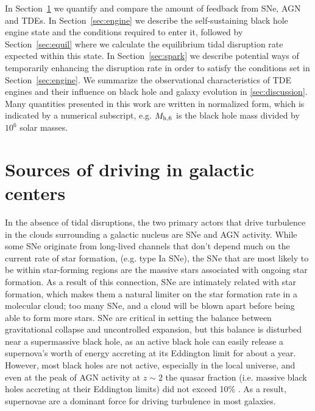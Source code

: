 \documentclass[preprint2]{aastex}
\newcommand{\mhsix}{M_{\rm h,6}\xspace}
\begin{document}
In Section~\ref{sec:sources} we quantify and compare the amount of feedback from SNe, AGN and TDEs. In Section~\ref{sec:engine} we describe the self-sustaining black hole engine state and the conditions required to enter it, followed by Section~\ref{sec:equil} where we calculate the equilibrium tidal disruption rate expected within this state. In Section~\ref{sec:spark} we describe potential ways of temporarily enhancing the disruption rate in order to satisfy the conditions set in Section~\ref{sec:engine}. We summarize the observational characteristics of TDE engines and their influence on black hole and galaxy evolution in \ref{sec:discussion}. Many quantities presented in this work are written in normalized form, which is indicated by a numerical subscript, e.g. $\mhsix$ is the black hole mass divided by $10^{6}$ solar masses.

\section{Sources of driving in galactic centers}\label{sec:sources}

In the absence of tidal disruptions, the two primary actors that drive turbulence in the clouds surrounding a galactic nucleus are SNe and AGN activity. While some SNe originate from long-lived channels that don't depend much on the current rate of star formation, (e.g. type Ia SNe), the SNe that are most likely to be within star-forming regions are the massive stars associated with ongoing star formation. As a result of this connection, SNe are intimately related with star formation, which makes them a natural limiter on the star formation rate in a molecular cloud; too many SNe, and a cloud will be blown apart before being able to form more stars. SNe are critical in setting the balance between gravitational collapse and uncontrolled expansion, but this balance is disturbed near a supermassive black hole, as an active black hole can easily release a supernova's worth of energy accreting at its Eddington limit for about a year. However, most black holes are not active, especially in the local universe, and even at the peak of AGN activity at $z \sim 2$ the quasar fraction (i.e. massive black holes accreting at their Eddington limits) did not exceed 10\% \citep{Martini:2013a}. As a result, supernovae are a dominant force for driving turbulence in most galaxies.
\end{document}
